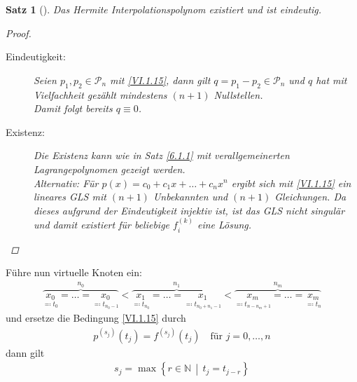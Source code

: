 \documentclass[ngerman,fontsize=11pt, paper=a4, parskip=half, titlepage=true, toc=bib]{scrbook}
\theoremstyle{definition}
\theoremstyle{plain}
\newtheorem{Satz}[Def]{Satz}		%
\newcommand{\N}{\mathds{N}}
\newenvironment{Satze}[1][]{ %
  \begin{Satz}[#1]  }
  { \end{Satz}
  	\addtocounter{subsection}{1}}
\begin{document}
\begin{Satze}\label{6.1.12}
  Das Hermite Interpolationspolynom existiert und ist eindeutig.

\begin{proof}~
  \begin{description}
    \item[Eindeutigkeit:] Seien $p_1,p_2\in\mathcal{P}_n$ mit
      \eqref{VI.1.15}, dann gilt $q=p_1-p_2\in\mathcal{P}_n$
      und $q$ hat mit Vielfachheit gezählt mindestens
      $(n+1)$ Nullstellen.\\
      Damit folgt bereits $q\equiv 0$.
\item[Existenz:] Die Existenz kann wie in Satz \ref{6.1.1}
mit verallgemeinerten Lagrangepolynomen gezeigt werden.\\
Alternativ: Für $p(x) = c_0+c_1x+ \dots +c_nx^n$ ergibt sich
mit \eqref{VI.1.15} ein lineares GLS mit $(n+1)$ Unbekannten
und $(n+1)$ Gleichungen.
Da dieses aufgrund der Eindeutigkeit injektiv ist, ist das GLS
nicht singulär und damit existiert für beliebige $f_i^{(k)}$ eine Lösung.
\end{description}
\end{proof}
\end{Satze}


Führe nun virtuelle Knoten ein:
 \begin{gather*}
   \overbrace{\underset{\eqqcolon t_0}{x_0}
     =\dots
     = \underset{\eqqcolon t_{n_0-1}}{x_0}
   }^{n_0}
 <   \overbrace{\underset{\eqqcolon t_{n_0}}{x_1}=\dots
     = \underset{\eqqcolon t_{n_0+n_1-1}}{x_1}}^{n_1}
 <  \overbrace{\underset{\eqqcolon t_{n-n_m+1}}{x_m}=\dots
     = \underset{\eqqcolon t_{n}}{x_m}}^{n_m}
 \end{gather*}
und ersetze die Bedingung \eqref{VI.1.15} durch
\begin{gather}
  p^{(s_j)}(t_j) = f^{(s_j)}(t_j) \quad \text{für } j=0,\dots,n
\label{VI.1.17}
\end{gather}
dann gilt
\begin{gather}
  s_j= \max\left\{ r\in\N\, \middle\vert\, t_j=t_{j-r}\right\}
  \label{VI.1.18}
\end{gather}
\end{document}
